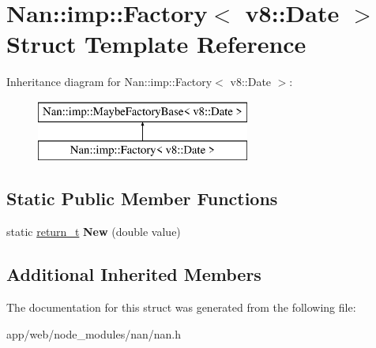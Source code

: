 \hypertarget{struct_nan_1_1imp_1_1_factory_3_01v8_1_1_date_01_4}{}\section{Nan\+:\+:imp\+:\+:Factory$<$ v8\+:\+:Date $>$ Struct Template Reference}
\label{struct_nan_1_1imp_1_1_factory_3_01v8_1_1_date_01_4}
Inheritance diagram for Nan\+:\+:imp\+:\+:Factory$<$ v8\+:\+:Date $>$\+:\begin{figure}[H]
\begin{center}
\leavevmode
\includegraphics[height=2.000000cm]{struct_nan_1_1imp_1_1_factory_3_01v8_1_1_date_01_4}
\end{center}
\end{figure}
\subsection*{Static Public Member Functions}
\begin{DoxyCompactItemize}
\item 
\mbox{\label{struct_nan_1_1imp_1_1_factory_3_01v8_1_1_date_01_4_a0cceadfd1cf4cd1463e4ae1db0d3e4ba}} 
static \hyperlink{class_maybe_local}{return\+\_\+t} {\bfseries New} (double value)
\end{DoxyCompactItemize}
\subsection*{Additional Inherited Members}


The documentation for this struct was generated from the following file\+:\begin{DoxyCompactItemize}
\item 
app/web/node\+\_\+modules/nan/nan.\+h\end{DoxyCompactItemize}

